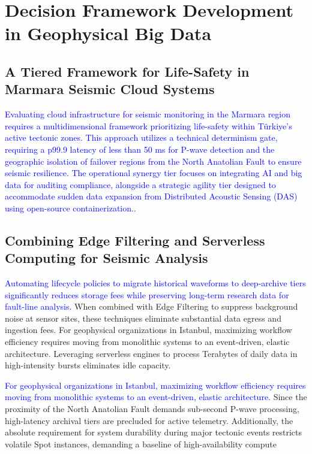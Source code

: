 \documentclass[data,article,submit,pdftex,moreauthors]{Definitions/mdpi}
\begin{document}
\section{Decision Framework Development in Geophysical Big Data}

\subsection{A Tiered Framework for Life-Safety in Marmara Seismic Cloud Systems}

\textcolor{blue}{Evaluating cloud infrastructure for seismic monitoring in the Marmara region requires a multidimensional framework prioritizing life-safety within Türkiye's active tectonic zones. This approach utilizes a technical determinism gate, requiring a p99.9 latency of less than 50 ms for P-wave detection and the geographic isolation of failover regions from the North Anatolian Fault to ensure seismic resilience. The operational synergy tier focuses on integrating AI and big data for auditing compliance, alongside a strategic agility tier designed to accommodate sudden data expansion from Distributed Acoustic Sensing (DAS) using open-source containerization.}.

\subsection{Combining Edge Filtering and Serverless Computing for Seismic Analysis}

\textcolor{blue}{Automating lifecycle policies to migrate historical waveforms to deep-archive tiers significantly reduces storage fees while preserving long-term research data for fault-line analysis. }When combined with Edge Filtering to suppress background noise at sensor sites, these techniques eliminate substantial data egress and ingestion fees. For geophysical organizations in Istanbul, maximizing workflow efficiency requires moving from monolithic systems to an event-driven, elastic architecture. Leveraging serverless engines to process Terabytes of daily data in high-intensity bursts eliminates idle capacity. 

\textcolor{blue}{For geophysical organizations in Istanbul, maximizing workflow efficiency requires moving from monolithic systems to an event-driven, elastic architecture.} Since the proximity of the North Anatolian Fault demands sub-second P-wave processing, high-latency archival tiers are precluded for active telemetry. Additionally, the absolute requirement for system durability during major tectonic events restricts volatile Spot instances, demanding a baseline of high-availability compute
\end{document}
